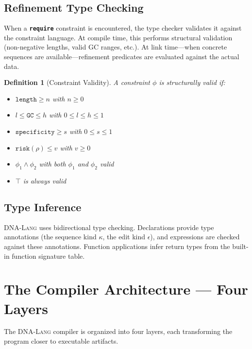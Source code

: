 \documentclass[12pt,a4paper]{article}
\newtheorem{definition}[theorem]{Definition}
\newcommand{\DNALang}{\textsc{DNA-Lang}}
\newcommand{\kw}[1]{\textbf{\texttt{#1}}}
\begin{document}
\subsection{Refinement Type Checking}

When a \kw{require} constraint is encountered, the type checker validates it against the constraint language. At compile time, this performs structural validation (non-negative lengths, valid GC ranges, etc.). At link time---when concrete sequences are available---refinement predicates are evaluated against the actual data.

\begin{definition}[Constraint Validity]
A constraint $\phi$ is \emph{structurally valid} if:
\begin{itemize}
    \item $\texttt{length} \geq n$ with $n \geq 0$
    \item $l \leq \texttt{GC} \leq h$ with $0 \leq l \leq h \leq 1$
    \item $\texttt{specificity} \geq s$ with $0 \leq s \leq 1$
    \item $\texttt{risk}(\rho) \leq v$ with $v \geq 0$
    \item $\phi_1 \wedge \phi_2$ with both $\phi_1$ and $\phi_2$ valid
    \item $\top$ is always valid
\end{itemize}
\end{definition}

\subsection{Type Inference}

\DNALang{} uses bidirectional type checking. Declarations provide type annotations (the sequence kind $\kappa$, the edit kind $\epsilon$), and expressions are checked against these annotations. Function applications infer return types from the built-in function signature table.


\section{The Compiler Architecture --- Four Layers}
\label{sec:compiler}

The \DNALang{} compiler is organized into four layers, each transforming the program closer to executable artifacts.
\end{document}
